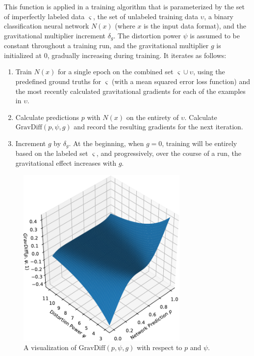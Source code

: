 \documentclass[10pt]{article}
\begin{document}
This function is applied in a training algorithm that is parameterized by the set of imperfectly labeled data $\varsigma$, the set of unlabeled training data $\upsilon$, a binary classification neural network $N(x)$ (where $x$ is the input data format), and the gravitational multiplier increment $\delta_g$. The distortion power $\psi$ is assumed to be constant throughout a training run, and the gravitational multiplier $g$ is initialized at 0, gradually increasing during training. It iterates as follows:

\begin{enumerate}
    \item Train $N(x)$ for a single epoch on the combined set $\varsigma \cup \upsilon$, using the predefined ground truths for $\varsigma$ (with a mean squared error loss function) and the most recently calculated gravitational gradients for each of the examples in $\upsilon$.
    \item Calculate predictions $p$ with $N(x)$ on the entirety of $\upsilon$. Calculate $\mathrm{GravDiff}(p, \psi, g)$ and record the resulting gradients for the next iteration.
    \item Increment $g$ by $\delta_{g}$. At the beginning, when $g = 0$, training will be entirely based on the labeled set $\varsigma$, and progressively, over the course of a run, the gravitational effect increases with $g$.
\end{enumerate}

\begin{figure}[H]
    \centering
    \includegraphics[width=0.75\textwidth]{grav_diff}
    \caption{\label{grav_diff} A visualization of $\mathrm{GravDiff}(p, \psi, g)$ with respect to $p$ and $\psi$.}
\end{figure}
\end{document}
